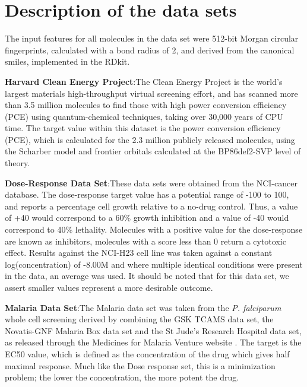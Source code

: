 \section{Description of the data sets}

The input features for all molecules in the data set were 512-bit Morgan circular fingerprints\cite{Rogers_2010}, calculated with a bond radius of 2, and derived from the canonical smiles, implemented in the RDkit\cite{rdkit}.

\textbf{Harvard Clean Energy Project}:The Clean Energy Project is the world's largest materials high-throughput virtual screening effort\cite{hachmann_lead_2014,hachmann_harvard_2011}, and has scanned more than 3.5 million molecules to find those with high power conversion efficiency (PCE) using quantum-chemical techniques, taking over 30,000 years of CPU time. The target value within this dataset is the power conversion efficiency (PCE), which is calculated for the 2.3 million publicly released molecules, using the Scharber model\cite{scharber_design_2006} and frontier orbitals calculated at the BP86\cite{perdew_density-functional_1986,becke_densityfunctional_1993}\/def2-SVP\cite{weigend_balanced_2005} level of theory.


\textbf{Dose-Response Data Set}:These data sets were obtained from the NCI-cancer database\cite{_nci_}.  The dose-response target value has a potential range of -100 to 100, and reports a percentage cell growth relative to a no-drug control.  Thus, a value of +40 would correspond to a 60\% growth inhibition and a value of -40 would correspond to 40\% lethality.  Molecules with a positive value for the dose-response are known as inhibitors, molecules with a score less than 0 return a cytotoxic effect. Results against the NCI-H23 cell line was taken against a constant log(concentration) of -8.00M and where multiple identical conditions were present in the data, an average was used.  It should be noted that for this data set, we assert smaller values represent a more desirable outcome. 


\textbf{Malaria Data Set}:The Malaria data set was taken from the \textit{P. falciparum} whole cell screening derived by combining the GSK TCAMS data set, the Novatis-GNF Malaria Box data set and the St Jude's Research Hospital data set, as released through the Medicines for Malaria Venture website \cite{23798988}.  The target is the EC50 value, which is defined as the concentration of the drug which gives half maximal response.  Much like the Dose response set, this is a minimization problem; the lower the concentration, the more potent the drug.
